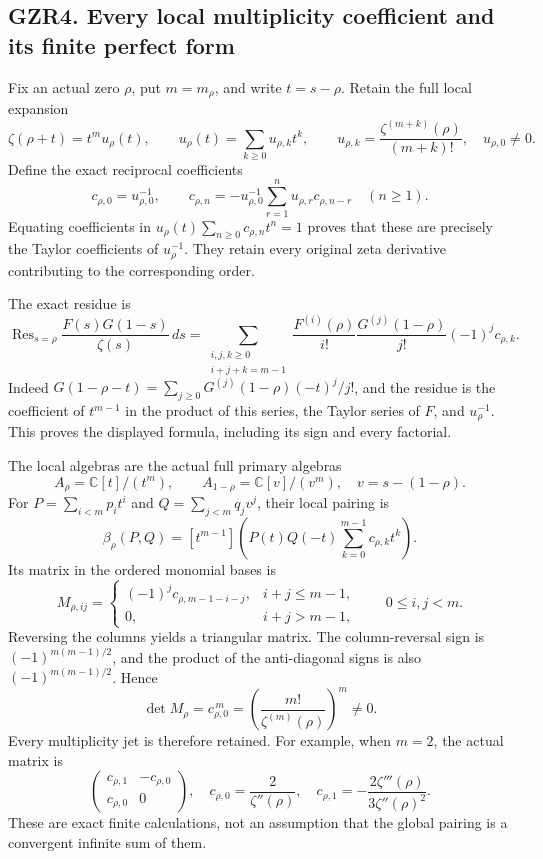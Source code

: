 \subsection{GZR4. Every local multiplicity coefficient and its finite
perfect
form}\label{gzr4.-every-local-multiplicity-coefficient-and-its-finite-perfect-form}

Fix an actual zero \(\rho\), put \(m=m_\rho\), and write \(t=s-\rho\).
Retain the full local expansion \[
\zeta(\rho+t)=t^m u_\rho(t),\qquad
u_\rho(t)=\sum_{k\ge0}u_{\rho,k}t^k,\qquad
u_{\rho,k}=\frac{\zeta^{(m+k)}(\rho)}{(m+k)!},
\quad u_{\rho,0}\ne0.
\tag{GZR4.1}
\] Define the exact reciprocal coefficients \[
c_{\rho,0}=u_{\rho,0}^{-1},\qquad
c_{\rho,n}=-u_{\rho,0}^{-1}
\sum_{r=1}^{n}u_{\rho,r}c_{\rho,n-r}\quad(n\ge1).
\tag{GZR4.2}
\] Equating coefficients in \(u_\rho(t)\sum_{n\ge0}c_{\rho,n}t^n=1\)
proves that these are precisely the Taylor coefficients of
\(u_\rho^{-1}\). They retain every original zeta derivative contributing
to the corresponding order.

The exact residue is \[
\operatorname{Res}_{s=\rho}
\frac{F(s)G(1-s)}{\zeta(s)}\,ds
=
\sum_{\substack{i,j,k\ge0\\i+j+k=m-1}}
\frac{F^{(i)}(\rho)}{i!}
\frac{G^{(j)}(1-\rho)}{j!}
(-1)^j c_{\rho,k}.
\tag{GZR4.3}
\] Indeed \(G(1-\rho-t)=\sum_{j\ge0}G^{(j)}(1-\rho)(-t)^j/j!\), and the
residue is the coefficient of \(t^{m-1}\) in the product of this series,
the Taylor series of \(F\), and \(u_\rho^{-1}\). This proves the
displayed formula, including its sign and every factorial.

The local algebras are the actual full primary algebras \[
A_\rho=\mathbb C[t]/(t^m),\qquad
A_{1-\rho}=\mathbb C[v]/(v^m),\quad v=s-(1-\rho).
\tag{GZR4.4}
\] For \(P=\sum_{i<m}p_it^i\) and \(Q=\sum_{j<m}q_jv^j\), their local
pairing is \[
\beta_\rho(P,Q)
=[t^{m-1}]\left(
P(t)Q(-t)\sum_{k=0}^{m-1}c_{\rho,k}t^k
\right).
\tag{GZR4.5}
\] Its matrix in the ordered monomial bases is \[
M_{\rho,ij}=
\begin{cases}
(-1)^j c_{\rho,m-1-i-j},&i+j\le m-1,\\
0,&i+j>m-1,
\end{cases}
\qquad 0\le i,j<m.
\tag{GZR4.6}
\] Reversing the columns yields a triangular matrix. The column-reversal
sign is \((-1)^{m(m-1)/2}\), and the product of the anti-diagonal signs
is also \((-1)^{m(m-1)/2}\). Hence \[
\det M_\rho=c_{\rho,0}^{\,m}
=\left(\frac{m!}{\zeta^{(m)}(\rho)}\right)^m\ne0.
\tag{GZR4.7}
\] Every multiplicity jet is therefore retained. For example, when
\(m=2\), the actual matrix is \[
\begin{pmatrix}c_{\rho,1}&-c_{\rho,0}\\
c_{\rho,0}&0\end{pmatrix},
\quad
c_{\rho,0}=\frac{2}{\zeta''(\rho)},\quad
c_{\rho,1}=-\frac{2\zeta'''(\rho)}{3\zeta''(\rho)^2}.
\tag{GZR4.8}
\] These are exact finite calculations, not an assumption that the
global pairing is a convergent infinite sum of them.

